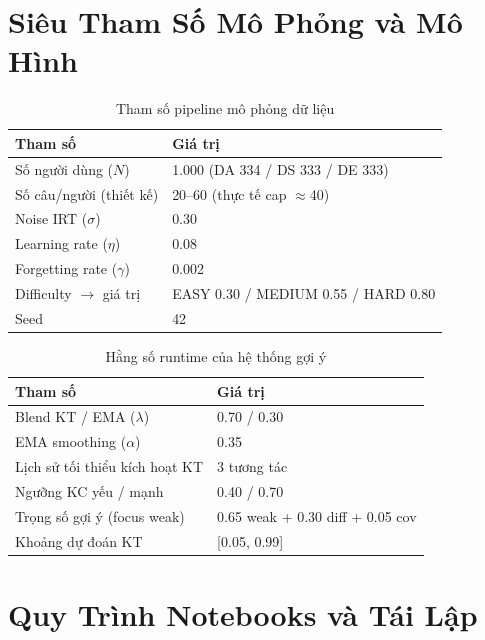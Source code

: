 \section{Siêu Tham Số Mô Phỏng và Mô Hình}
\label{apx:hparams}

\begin{table}[H]
  \centering
  \caption{Tham số pipeline mô phỏng dữ liệu}
  \begin{tabular}{ll}
    \toprule
    \textbf{Tham số} & \textbf{Giá trị} \\
    \midrule
    Số người dùng ($N$)            & 1.000 (DA 334 / DS 333 / DE 333) \\
    Số câu/người (thiết kế)        & 20--60 (thực tế cap $\approx$40) \\
    Noise IRT ($\sigma$)           & 0.30 \\
    Learning rate ($\eta$)         & 0.08 \\
    Forgetting rate ($\gamma$)     & 0.002 \\
    Difficulty $\to$ giá trị       & EASY 0.30 / MEDIUM 0.55 / HARD 0.80 \\
    Seed                           & 42 \\
    \bottomrule
  \end{tabular}
\end{table}

\begin{table}[H]
  \centering
  \caption{Hằng số runtime của hệ thống gợi ý}
  \begin{tabular}{ll}
    \toprule
    \textbf{Tham số} & \textbf{Giá trị} \\
    \midrule
    Blend KT / EMA ($\lambda$)        & 0.70 / 0.30 \\
    EMA smoothing ($\alpha$)          & 0.35 \\
    Lịch sử tối thiểu kích hoạt KT    & 3 tương tác \\
    Ngưỡng KC yếu / mạnh              & 0.40 / 0.70 \\
    Trọng số gợi ý (focus weak)       & 0.65 weak + 0.30 diff + 0.05 cov \\
    Khoảng dự đoán KT                 & [0.05, 0.99] \\
    \bottomrule
  \end{tabular}
\end{table}

\section{Quy Trình Notebooks và Tái Lập}
\label{apx:reproducibility}

